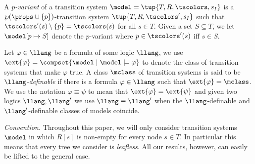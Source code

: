 A \emph{$p$-variant} of a transition system $\model = \tup{T,R,\tscolors,s_I}$
is a $\wp (\props\cup\{p\})$-transition system $\tup{T,R,\tscolors',s_I}$
such that $\tscolors'(s)\setminus\{p\} = \tscolors(s)$ for all $s \in T$.
Given a set $S \subseteq T$, we let $\model[p\mapsto S]$ denote the $p$-variant
where $p \in \tscolors'(s)$ iff $s \in S$.

Let $\varphi \in \llang$ be a formula of some logic $\llang$,
we use $\ext{\varphi} = \compset{\model \mid \model \models \varphi}$ to denote the class
of transition systems that make $\varphi$ true.
A class $\mclass$ of transition systems is said to be \emph{$\llang$-definable} if there
is a formula $\varphi \in \llang$ such that $\ext{\varphi} = \mclass$.
We use the notation $\varphi \equiv \psi$ to mean that $\ext{\varphi} = \ext{\psi}$ and given two logics
$\llang, \llang'$ we use $\llang \equiv \llang'$ when the $\llang$-definable and $\llang'$-definable
classes of models coincide.

\textit{Convention.}
Throughout this paper, we will only consider transition systems $\model$
in which $R[s]$ is non-empty for every node $s \in T$.
In particular this means that every tree we consider is \emph{leafless}.
All our results, however, can easily be lifted to the general case.